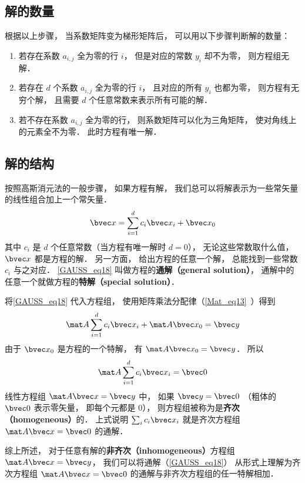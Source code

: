\subsection{解的数量}
根据以上步骤， 当系数矩阵变为梯形矩阵后， 可以用以下步骤判断解的数量：
\begin{enumerate}
\item 若存在系数 $a_{i,j}$ 全为零的行 $i$， 但是对应的常数 $y_i$ 却不为零， 则方程组无解．
\item 若存在 $d$ 个系数 $a_{i,j}$ 全为零的行 $i$， 且对应的所有 $y_i$ 也都为零， 则方程有无穷个解， 且需要 $d$ 个任意常数来表示所有可能的解．
\item 若不存在系数 $a_{i,j}$ 全为零的行， 则系数矩阵可以化为三角矩阵， 使对角线上的元素全不为零． 此时方程有唯一解．
\end{enumerate}

\subsection{解的结构}
按照高斯消元法的一般步骤， 如果方程有解， 我们总可以将解表示为一些常矢量的线性组合加上一个常矢量．
\begin{equation}\label{GAUSS_eq18}
\bvec x = \sum_{i=1}^{d} c_i \bvec x_i + \bvec x_0
\end{equation}
其中 $c_i$ 是 $d$ 个任意常数（当方程有唯一解时 $d = 0$）， 无论这些常数取什么值， $\bvec x$ 都是方程的解． 另一方面， 给出方程的任意一个解， 总能找到一些常数 $c_i$ 与之对应． \autoref{GAUSS_eq18} 叫做方程的\textbf{通解（general solution）}， 通解中的任意一个就做方程的\textbf{特解（special solution）}．

将\autoref{GAUSS_eq18} 代入方程组， 使用矩阵乘法分配律（\autoref{Mat_eq13}~）得到
\begin{equation}
\mat A \sum_{i=1}^{d} c_i \bvec x_i + \mat A \bvec x_0 = \bvec y
\end{equation}
由于 $\bvec x_0$ 是方程的一个特解， 有 $\mat A \bvec x_0 = \bvec y$． 所以
\begin{equation}
\mat A \sum_{i=1}^{d} c_i \bvec x_i = \bvec 0
\end{equation}
线性方程组 $\mat A \bvec x = \bvec y$ 中， 如果 $\bvec y = \bvec 0$ （粗体的 $\bvec 0$ 表示零矢量， 即每个元都是 $0$），%
则方程组被称为是\textbf{齐次（homogeneous）}的． 上式说明 $\sum_{i} c_i \bvec x_i$ 就是齐次方程组 $\mat A \bvec x = \bvec 0$ 的通解．

综上所述， 对于任意有解的\textbf{非齐次（inhomogeneous）}方程组 $\mat A \bvec x = \bvec y$， 我们可以将通解（\autoref{GAUSS_eq18}） 从形式上理解为齐次方程组 $\mat A \bvec x = \bvec 0$ 的通解与非齐次方程组的任一特解相加．
